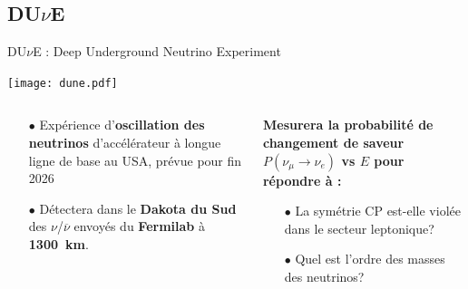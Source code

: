     \subsection{DU$\nu$E}

    \begin{frame}{DU$\nu$E : Deep Underground Neutrino Experiment}
        \begin{scriptsize}
            \centering
            \texttt{[image: dune.pdf]}\\
            \vspace{1cm}
            \begin{columns}
                \begin{column}{0.5\textwidth}
                    \begin{itemize}
                        \item[$\bullet$] Expérience d'\textbf{oscillation des neutrinos} d'accélérateur à longue ligne de base au USA, prévue pour fin 2026
                        \item[$\bullet$] Détectera dans le \textbf{Dakota du Sud} des $\nu$/$\overline{\nu}$ envoyés du \textbf{Fermilab} à \textbf{\SI{1300}{\kilo\meter}}.
                    \end{itemize}
                \end{column}
                \begin{column}{0.5\textwidth}
                    \textbf{Mesurera la probabilité de changement de saveur $P(\nu_{\mu}\to\nu_e)$ vs $E$ pour répondre à : }
                    \begin{itemize}
                        \item[$\bullet$] La symétrie CP est-elle violée dans le secteur leptonique?
                        \item[$\bullet$] Quel est l'ordre des masses des neutrinos?
                    \end{itemize}
                \end{column}
            \end{columns}
        \end{scriptsize}
    \end{frame}

